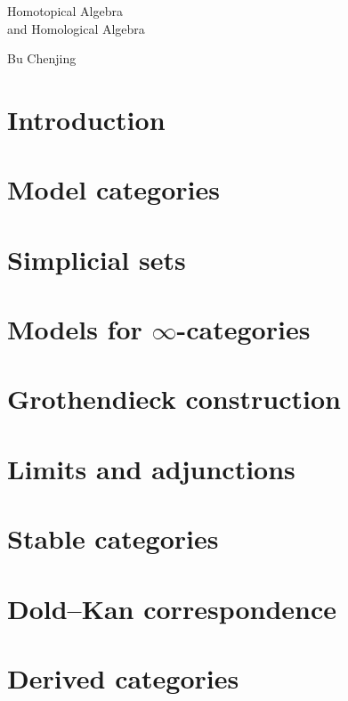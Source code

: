 \documentclass{article}
\begin{document}
\noindent
{\LARGE Homotopical Algebra\\[3pt]and Homological Algebra}
\vspace{20pt}

\noindent
Bu Chenjing
\vspace{40pt}

\section{Introduction}



\section{Model categories}



\section{Simplicial sets}



\section{Models for \texorpdfstring{$\infty$}{∞}-categories}



\section{Grothendieck construction}



\section{Limits and adjunctions}



\section{Stable categories}



\section{Dold--Kan correspondence}

\nyw

\section{Derived categories}

\nyw


\end{document}
